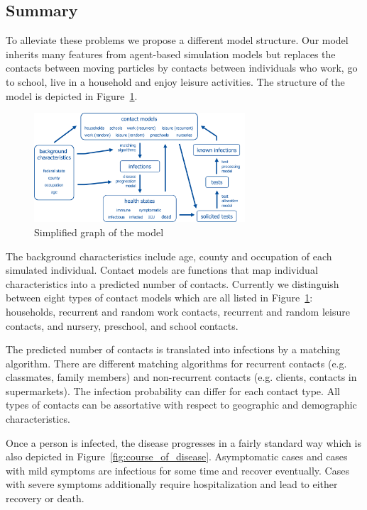 \subsection{Summary}
\label{sub:model_summary}

To alleviate these problems we propose a different model structure. Our model inherits many features from agent-based simulation models but replaces the contacts between moving particles by contacts between individuals who work, go to school, live in a household and enjoy leisure activities. The structure of the model is depicted in Figure~\ref{fig:model_graph}.

\begin{figure}[!ht]
    \centering
    \includegraphics[width=0.7\textwidth]{../figures/model_detailed.png}
    \caption{Simplified graph of the model}
    \label{fig:model_graph}
\end{figure}

The background characteristics include age, county and occupation of each simulated individual. Contact models are functions that map individual characteristics into a predicted number of contacts. Currently we distinguish between eight types of contact models which are all listed in Figure~\ref{fig:model_graph}: households, recurrent and random work contacts, recurrent and random leisure contacts, and nursery, preschool, and school contacts.

The predicted number of contacts is translated into infections by a matching algorithm. There are different matching algorithms for recurrent contacts (e.g. classmates, family members) and non-recurrent contacts (e.g. clients, contacts in supermarkets). The infection probability can differ for each contact type. All types of contacts can be assortative with respect to geographic and demographic characteristics.

Once a person is infected, the disease progresses in a fairly standard way which is also depicted in Figure~\ref{fig:course_of_disease}. Asymptomatic cases and cases with mild symptoms are infectious for some time and recover eventually. Cases with severe symptoms additionally require hospitalization and lead to either recovery or death.


